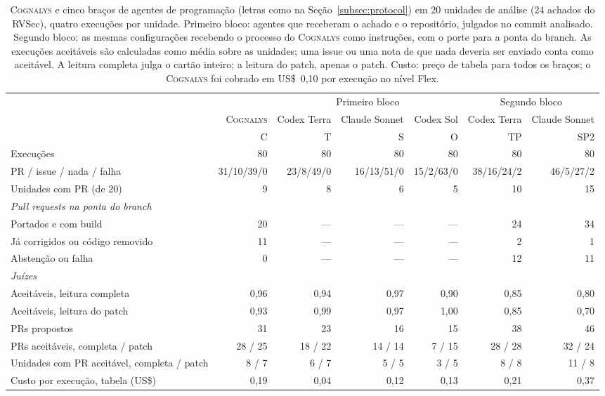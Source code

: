 \documentclass[conference]{IEEEtran}
\newcommand{\system}{\textsc{Cognalys}}
\begin{document}
\begin{table}[t]
\centering
\caption{\system{} e cinco braços de agentes de programação (letras como na
Seção~\ref{subsec:protocol}) em 20 unidades de análise (24 achados do RVSec), quatro execuções por unidade. Primeiro
bloco: agentes que receberam o achado e o repositório, julgados no commit analisado. Segundo
bloco: as mesmas configurações recebendo o processo do \system{} como instruções, com o
porte para a ponta do branch. As execuções aceitáveis são calculadas como média sobre
as unidades; uma issue ou uma nota de que nada deveria ser enviado conta como aceitável. A
leitura completa julga o cartão inteiro; a leitura do patch, apenas o patch. Custo: preço de
tabela para todos os braços; o \system{} foi cobrado em US\$~0,10 por execução no nível Flex.}
\label{tab:optiona}
\footnotesize
\setlength{\tabcolsep}{4pt}
\begin{tabular}{p{4.2cm}r|rrr|rr}
\toprule
 & & \multicolumn{3}{c|}{Primeiro bloco} & \multicolumn{2}{c}{Segundo bloco} \\
 & \system{} & Codex Terra & Claude Sonnet & Codex Sol & Codex Terra & Claude Sonnet \\
 & C & T & S & O & TP & SP2 \\
\midrule
Execuções & 80 & 80 & 80 & 80 & 80 & 80 \\
PR / issue / nada / falha & 31/10/39/0 & 23/8/49/0 & 16/13/51/0 & 15/2/63/0 & 38/16/24/2 & 46/5/27/2 \\
Unidades com PR (de 20) & 9 & 8 & 6 & 5 & 10 & 15 \\
\multicolumn{7}{l}{\emph{Pull requests na ponta do branch}} \\
\quad Portados e com build & 20 & --- & --- & --- & 24 & 34 \\
\quad Já corrigidos ou código removido & 11 & --- & --- & --- & 2 & 1 \\
\quad Abstenção ou falha & 0 & --- & --- & --- & 12 & 11 \\
\multicolumn{7}{l}{\emph{Juízes}} \\
\quad Aceitáveis, leitura completa & 0,96 & 0,94 & 0,97 & 0,90 & 0,85 & 0,80 \\
\quad Aceitáveis, leitura do patch & 0,93 & 0,99 & 0,97 & 1,00 & 0,85 & 0,70 \\
\quad PRs propostos & 31 & 23 & 16 & 15 & 38 & 46 \\
\quad PRs aceitáveis, completa / patch & 28 / 25 & 18 / 22 & 14 / 14 & 7 / 15 & 28 / 28 & 32 / 24 \\
\quad Unidades com PR aceitável, completa / patch & 8 / 7 & 6 / 7 & 5 / 5 & 3 / 5 & 8 / 8 & 11 / 8 \\
Custo por execução, tabela (US\$) & 0,19 & 0,04 & 0,12 & 0,13 & 0,21 & 0,37 \\
\bottomrule
\end{tabular}
\end{table}
\end{document}
